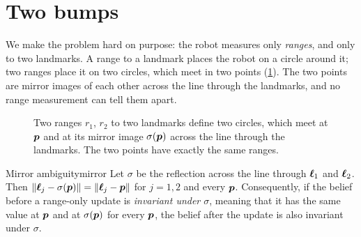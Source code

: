 \section{Two bumps}
\label{sec:twobumps}

We make the problem hard on purpose: the robot measures only
\emph{ranges}, and only to two landmarks. A range to a landmark places
the robot on a circle around it; two ranges place it on two circles, which
meet in two points (\cref{fig:mirror}). The two points are mirror images
of each other across the line through the landmarks, and no range
measurement can tell them apart.

\begin{figure}[ht]
\centering
{}
\caption{Two ranges $r_1$, $r_2$ to two landmarks define two circles,
which meet at $\bm{p}$ and at its mirror image $\sigma(\bm{p})$ across the line
through the landmarks. The two points have exactly the same ranges.}
\label{fig:mirror}
\end{figure}

\begin{proposition}{Mirror ambiguity}{mirror}
Let $\sigma$ be the reflection across the line through $\bm{\ell}_1$ and
$\bm{\ell}_2$. Then $\left\lVert \bm{\ell}_j-\sigma(\bm{p})\right\rVert=\left\lVert \bm{\ell}_j-\bm{p}\right\rVert$ for $j=1,2$
and every $\bm{p}$. Consequently, if the belief before a range-only update is
\emph{invariant under $\sigma$}, meaning that it has the same value at
$\bm{p}$ and at $\sigma(\bm{p})$ for every $\bm{p}$, the belief after the update is
also invariant under $\sigma$.
\end{proposition}

